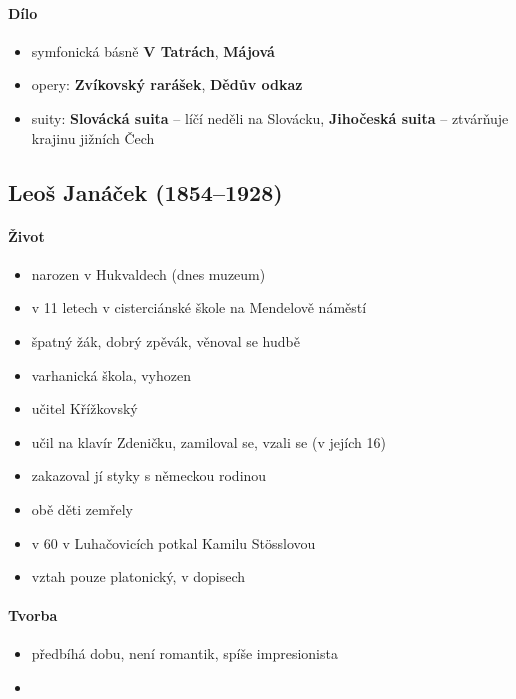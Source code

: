 \paragraph{Dílo}
\begin{itemize}
\item symfonická básně \textbf{V Tatrách}, \textbf{Májová}
\item opery: \textbf{Zvíkovský rarášek}, \textbf{Dědův odkaz}
\item suity: \textbf{Slovácká suita} -- líčí neděli na Slovácku, \textbf{Jihočeská suita} -- ztvárňuje krajinu jižních Čech
\end{itemize}


\subsection{Leoš Janáček (1854--1928)} 
\paragraph{Život}
\begin{itemize}
\item narozen v Hukvaldech (dnes muzeum)
\item v 11 letech v cisterciánské škole na Mendelově náměstí
\item špatný žák, dobrý zpěvák, věnoval se hudbě
\item varhanická škola, vyhozen
\item učitel Křížkovský
\item učil na klavír Zdeničku, zamiloval se, vzali se (v jejích 16)
\item zakazoval jí styky s německou rodinou
\item obě děti zemřely
\item v 60 v Luhačovicích potkal Kamilu Stösslovou
\item vztah pouze platonický, v dopisech
\end{itemize}

\paragraph{Tvorba}
\begin{itemize}
\item předbíhá dobu, není romantik, spíše impresionista
\item 
\end{itemize}

